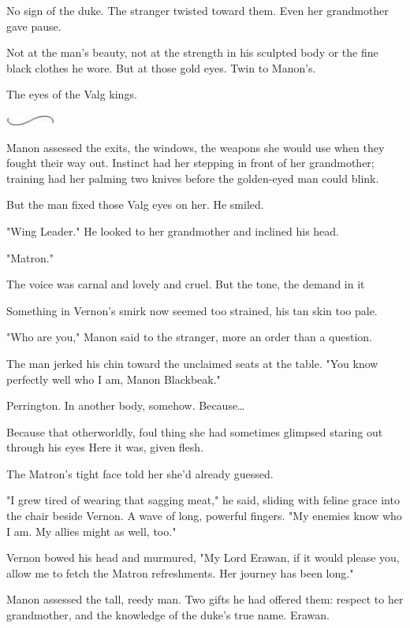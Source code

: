 No sign of the duke. The stranger twisted toward them. Even her grandmother gave pause.

Not at the man's beauty, not at the strength in his sculpted body or the fine black clothes he wore. But at those gold eyes. Twin to Manon's.

The eyes of the Valg kings.

\includegraphics[width=0.65in,height=0.13in]{images/seperator}

Manon assessed the exits, the windows, the weapons she would use when they fought their way out. Instinct had her stepping in front of her grandmother; training had her palming two knives before the golden-eyed man could blink.

But the man fixed those Valg eyes on her. He smiled.

"Wing Leader." He looked to her grandmother and inclined his head.

"Matron."

The voice was carnal and lovely and cruel. But the tone, the demand in it 

Something in Vernon's smirk now seemed too strained, his tan skin too pale.

"Who are you," Manon said to the stranger, more an order than a question.

The man jerked his chin toward the unclaimed seats at the table. "You know perfectly well who I am, Manon Blackbeak."

Perrington. In another body, somehow. Because\ldots{}

Because that otherworldly, foul thing she had sometimes glimpsed staring out through his eyes  Here it was, given flesh.

The Matron's tight face told her she'd already guessed.

"I grew tired of wearing that sagging meat," he said, sliding with feline grace into the chair beside Vernon. A wave of long, powerful fingers. "My enemies know who I am. My allies might as well, too."

Vernon bowed his head and murmured, "My Lord Erawan, if it would please you, allow me to fetch the Matron refreshments. Her journey has been long."

Manon assessed the tall, reedy man. Two gifts he had offered them:
respect to her grandmother, and the knowledge of the duke's true name. Erawan.

